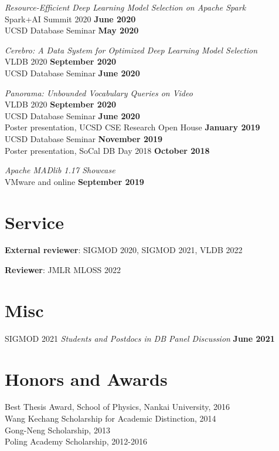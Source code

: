 \documentclass[margin,line]{res}
\begin{document}
\begin{resume}
\vspace{-3mm}
\textit{Resource-Efficient Deep Learning Model Selection on Apache Spark}\\
Spark+AI Summit 2020 \hfill {\bf June 2020}\\
UCSD Database Seminar \hfill {\bf May 2020}

\vspace{-3mm}
\textit{Cerebro: A Data System for Optimized Deep Learning Model Selection}\\
VLDB 2020 \hfill {\bf September 2020}\\
UCSD Database Seminar \hfill {\bf June 2020}

\vspace{-3mm}
\textit{Panorama: Unbounded Vocabulary Queries on Video}\\
VLDB 2020 \hfill {\bf September 2020}\\
UCSD Database Seminar \hfill {\bf June 2020}\\
Poster presentation, UCSD CSE Research Open House \hfill {\bf January 2019}\\
UCSD Database Seminar \hfill {\bf November 2019}\\
Poster presentation, SoCal DB Day 2018 \hfill {\bf October 2018}

\vspace{-3mm}
\textit{Apache MADlib 1.17 Showcase}\\
VMware and online \hfill {\bf September 2019}\\


\section{\sc Service}

\textbf{External reviewer}: SIGMOD 2020, SIGMOD 2021, VLDB 2022

\textbf{Reviewer}: JMLR MLOSS 2022


\section{\sc Misc}

SIGMOD 2021 \textit{Students and Postdocs in DB Panel Discussion} \hfill {\bf June 2021}


\section{\sc Honors and Awards} 
Best Thesis Award, School of Physics, Nankai University, 2016\\
Wang Kechang Scholarship for Academic Distinction, 2014\\
Gong-Neng Scholarship, 2013\\
Poling Academy Scholarship, 2012-2016



\end{resume}
\end{document}

